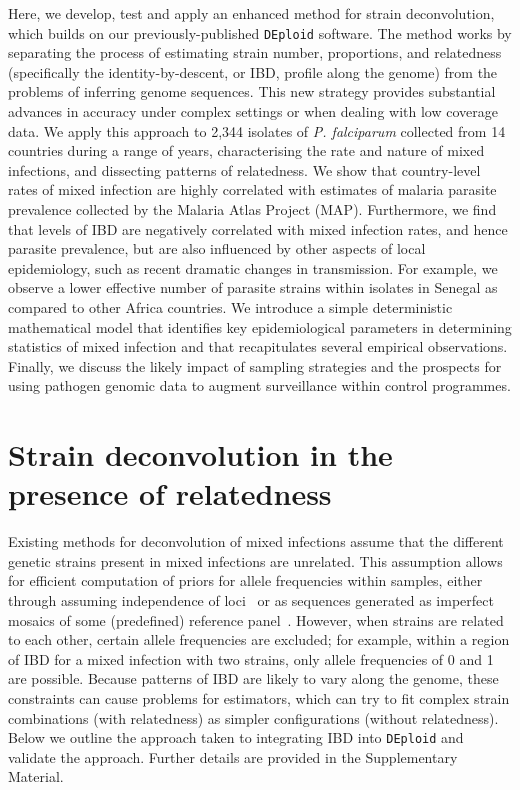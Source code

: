 \documentclass[9pt,lineno]{elife}
\begin{document}
Here, we develop, test and apply an enhanced method for strain deconvolution, which builds on our previously-published \texttt{DEploid} software.  The method works by separating the process of estimating strain number, proportions, and relatedness (specifically the identity-by-descent, or IBD, profile along the genome) from the problems of inferring genome sequences. This new strategy provides substantial advances in accuracy under complex settings or when dealing with low coverage data.  We apply this approach to 2,344 isolates of {\it P. falciparum} collected from 14 countries during a range of years, characterising the rate and nature of mixed infections, and dissecting patterns of relatedness.  We show that country-level rates of mixed infection are highly correlated with estimates of malaria parasite prevalence collected by the Malaria Atlas Project (MAP). Furthermore, we find that levels of IBD are negatively correlated with mixed infection rates, and hence parasite prevalence, but are also influenced by other aspects of local epidemiology, such as recent dramatic changes in transmission. For example, we observe a lower effective number of parasite strains within isolates in Senegal as compared to other Africa countries.  We introduce a simple deterministic mathematical model that identifies key epidemiological parameters in determining statistics of mixed infection and that recapitulates several empirical observations.  Finally, we discuss the likely impact of sampling strategies and the prospects for using pathogen genomic data to augment surveillance within control programmes.



\section{Strain deconvolution in the presence of relatedness}

Existing methods for deconvolution of mixed infections assume that the different genetic strains present in mixed infections are unrelated.  This assumption allows for efficient computation of priors for allele frequencies within samples, either through assuming independence of loci~\citep{Jack2016} or as sequences generated as imperfect mosaics of some (predefined) reference panel~\citep{Zhu2017}.  However, when strains are related to each other, certain allele frequencies are excluded; for example, within a region of IBD for a mixed infection with two strains, only allele frequencies of 0 and 1 are possible.  Because patterns of IBD are likely to vary along the genome, these constraints can cause problems for estimators, which can try to fit complex strain combinations (with relatedness) as simpler configurations (without relatedness).  Below we outline the approach taken to integrating IBD into \texttt{DEploid} and validate the approach.  Further details are provided in the Supplementary Material.
\end{document}
